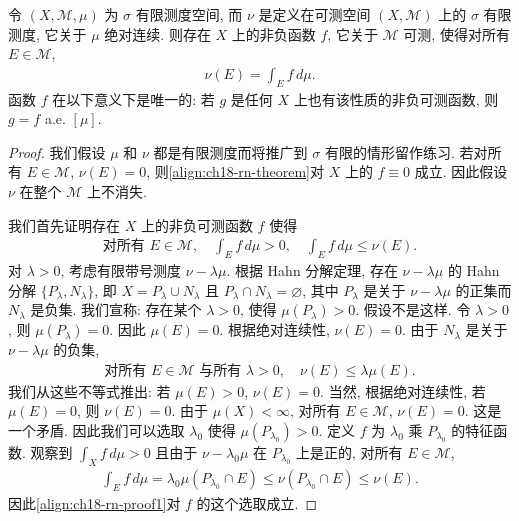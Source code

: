 \documentclass[../../main.tex]{subfiles}
\begin{document}
\begin{theorem}\label{theorem:ch18-radon-nikodym}
令 $(X,\mathcal{M},\mu)$ 为 $\sigma$ 有限测度空间, 而 $\nu$ 是定义在可测空间 $(X,\mathcal{M})$ 上的 $\sigma$ 有限测度, 它关于 $\mu$ 绝对连续. 则存在 $X$ 上的非负函数 $f$, 它关于 $\mathcal{M}$ 可测, 使得对所有 $E\in\mathcal{M}$,
\begin{align}
\nu(E)=\int_{E}f\,d\mu.\label{align:ch18-rn-theorem}
\end{align}
函数 $f$ 在以下意义下是唯一的: 若 $g$ 是任何 $X$ 上也有该性质的非负可测函数, 则 $g=f$ a.e. $[\mu]$.
\end{theorem}

\begin{proof}
我们假设 $\mu$ 和 $\nu$ 都是有限测度而将推广到 $\sigma$ 有限的情形留作练习. 若对所有 $E\in\mathcal{M}$, $\nu(E)=0$, 则\eqref{align:ch18-rn-theorem}对 $X$ 上的 $f\equiv 0$ 成立. 因此假设 $\nu$ 在整个 $\mathcal{M}$ 上不消失.

我们首先证明存在 $X$ 上的非负可测函数 $f$ 使得
\begin{align}
\text{对所有 }E\in\mathcal{M},\quad\int_{E}f\,d\mu>0,\quad\int_{E}f\,d\mu\leqslant\nu(E).\label{align:ch18-rn-proof1}
\end{align}
对 $\lambda>0$, 考虑有限带号测度 $\nu-\lambda\mu$. 根据 Hahn 分解定理, 存在 $\nu-\lambda\mu$ 的 Hahn 分解 $\{P_{\lambda},N_{\lambda}\}$, 即 $X=P_{\lambda}\cup N_{\lambda}$ 且 $P_{\lambda}\cap N_{\lambda}=\varnothing$, 其中 $P_{\lambda}$ 是关于 $\nu-\lambda\mu$ 的正集而 $N_{\lambda}$ 是负集. 我们宣称: 存在某个 $\lambda>0$, 使得 $\mu(P_{\lambda})>0$. 假设不是这样. 令 $\lambda>0$, 则 $\mu(P_{\lambda})=0$. 因此 $\mu(E)=0$. 根据绝对连续性, $\nu(E)=0$. 由于 $N_{\lambda}$ 是关于 $\nu-\lambda\mu$ 的负集,
\begin{align}
\text{对所有 }E\in\mathcal{M}\text{ 与所有 }\lambda>0,\quad\nu(E)\leqslant\lambda\mu(E).\label{align:ch18-rn-proof2}
\end{align}
我们从这些不等式推出: 若 $\mu(E)>0$, $\nu(E)=0$. 当然, 根据绝对连续性, 若 $\mu(E)=0$, 则 $\nu(E)=0$. 由于 $\mu(X)<\infty$, 对所有 $E\in\mathcal{M}$, $\nu(E)=0$. 这是一个矛盾. 因此我们可以选取 $\lambda_{0}$ 使得 $\mu(P_{\lambda_{0}})>0$. 定义 $f$ 为 $\lambda_{0}$ 乘 $P_{\lambda_{0}}$ 的特征函数. 观察到 $\int_{X}f\,d\mu>0$ 且由于 $\nu-\lambda_{0}\mu$ 在 $P_{\lambda_{0}}$ 上是正的, 对所有 $E\in\mathcal{M}$,
\begin{align*}
\int_{E}f\,d\mu=\lambda_{0}\mu(P_{\lambda_{0}}\cap E)\leqslant\nu(P_{\lambda_{0}}\cap E)\leqslant\nu(E).
\end{align*}
因此\eqref{align:ch18-rn-proof1}对 $f$ 的这个选取成立.


\end{proof}
\end{document}
